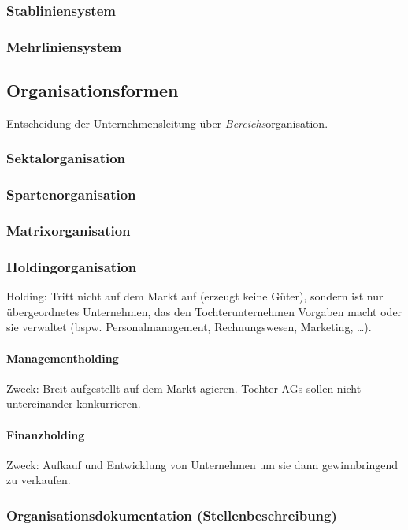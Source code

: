 \documentclass{scrreprt}
\begin{document}
\subsubsection{Stabliniensystem}
\subsubsection{Mehrliniensystem}

\subsection{Organisationsformen}
Entscheidung der Unternehmensleitung über \emph{Bereichs}organisation.
\subsubsection{Sektalorganisation}
\subsubsection{Spartenorganisation}
\subsubsection{Matrixorganisation}
\subsubsection{Holdingorganisation}
Holding: Tritt nicht auf dem Markt auf (erzeugt keine Güter), sondern ist nur übergeordnetes Unternehmen, das den Tochterunternehmen Vorgaben macht oder sie verwaltet (bspw. Personalmanagement, Rechnungswesen, Marketing, …). 
\paragraph{Managementholding} Zweck: Breit aufgestellt auf dem Markt agieren. Tochter-AGs sollen nicht untereinander konkurrieren.
\paragraph{Finanzholding}
Zweck: Aufkauf und Entwicklung von Unternehmen um sie dann gewinnbringend zu verkaufen.
\subsubsection{Organisationsdokumentation (Stellenbeschreibung)}
\end{document}
